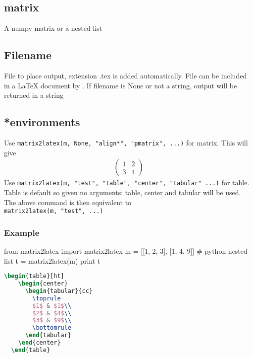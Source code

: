 \subsection{matrix}
  A numpy matrix or a nested list

\subsection{Filename}
  File to place output, extension .tex is added automatically. File can be included in a LaTeX
  document by \verb!!. If filename is None or not a string, output will be returned in a string
  
\subsection{*environments}
  Use 
\lstinline{matrix2latex(m, None, "align*", "pmatrix", ...)} for matrix.
  This will give
  \begin{align*}
    \begin{pmatrix}
      1 & 2 \\
      3 & 4
    \end{pmatrix}
  \end{align*}
  Use 
\lstinline{matrix2latex(m, "test", "table", "center", "tabular" ...)} for table.
  Table is default so given no arguments: table, center and tabular will be used.
  The above command is then equivalent to \\
\lstinline{matrix2latex(m, "test", ...)}

\subsubsection{Example}
\begin{sageblock}
  from matrix2latex import matrix2latex
  m = [[1, 2, 3], [1, 4, 9]] # python nested list
  t = matrix2latex(m)
  print t
\end{sageblock}
\begin{lstlisting}[language=tex, morekeywords={begin}]
  \begin{table}[ht]
    \begin{center}
      \begin{tabular}{cc}
        \toprule
        $1$ & $1$\\
        $2$ & $4$\\
        $3$ & $9$\\
        \bottomrule
      \end{tabular}
    \end{center}
  \end{table}
\end{lstlisting}

